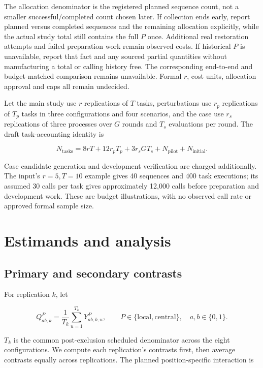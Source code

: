 \documentclass[
  english,
  11pt,
]{article}
\begin{document}
The allocation denominator is the registered planned sequence count, not
a smaller successful/completed count chosen later. If collection ends
early, report planned versus completed sequences and the remaining
allocation explicitly, while the actual study total still contains the
full \(P\) once. Additional real restoration attempts and failed
preparation work remain observed costs. If historical \(P\) is
unavailable, report that fact and any sourced partial quantities without
manufacturing a total or calling history free. The corresponding
end-to-end and budget-matched comparison remains unavailable. Formal
\(r\), cost units, allocation approval and caps all remain undecided.

Let the main study use \(r\) replications of \(T\) tasks, perturbations
use \(r_p\) replications of \(T_p\) tasks in three configurations and
four scenarios, and the case use \(r_s\) replications of three processes
over \(G\) rounds and \(T_s\) evaluations per round. The draft
task-accounting identity is

\[
N_{\mathrm{tasks}}=8rT+12r_pT_p+3r_sGT_s+N_{\mathrm{pilot}}+N_{\mathrm{initial}}.
\]

Case candidate generation and development verification are charged
additionally. The input's \(r=5,T=10\) example gives 40 sequences and
400 task executions; its assumed 30 calls per task gives approximately
12,000 calls before preparation and development work. These are budget
illustrations, with no observed call rate or approved formal sample
size.

\section{Estimands and analysis}\label{estimands-and-analysis}

\subsection{Primary and secondary
contrasts}\label{primary-and-secondary-contrasts}

For replication \(k\), let

\[
Q_{ab,k}^{P}=\frac{1}{T_k}\sum_{u=1}^{T_k}Y_{ab,k,u}^{P},
\qquad P\in\{\mathrm{local},\mathrm{central}\},\quad a,b\in\{0,1\}.
\]

\(T_k\) is the common post-exclusion scheduled denominator across the
eight configurations. We compute each replication's contrasts first,
then average contrasts equally across replications. The planned
position-specific interaction is
\end{document}
